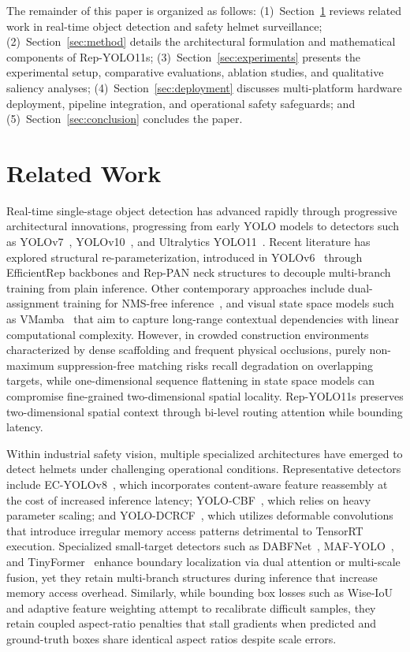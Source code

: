 \documentclass[conference]{IEEEtran}
\begin{document}
The remainder of this paper is organized as follows: (1)~Section~\ref{sec:related} reviews related work in real-time object detection and safety helmet surveillance; (2)~Section~\ref{sec:method} details the architectural formulation and mathematical components of Rep-YOLO11s; (3)~Section~\ref{sec:experiments} presents the experimental setup, comparative evaluations, ablation studies, and qualitative saliency analyses; (4)~Section~\ref{sec:deployment} discusses multi-platform hardware deployment, pipeline integration, and operational safety safeguards; and (5)~Section~\ref{sec:conclusion} concludes the paper.

\section{Related Work}
\label{sec:related}
Real-time single-stage object detection has advanced rapidly through progressive architectural innovations, progressing from early YOLO models to detectors such as YOLOv7~\cite{wang2023yolov7}, YOLOv10~\cite{wang2024yolov10}, and Ultralytics YOLO11~\cite{ultralytics2024yolo11}. Recent literature has explored structural re-parameterization, introduced in YOLOv6~\cite{li2023yolov6} through EfficientRep backbones and Rep-PAN neck structures to decouple multi-branch training from plain inference. Other contemporary approaches include dual-assignment training for NMS-free inference~\cite{wang2024yolov10,yolo26_2025}, and visual state space models such as VMamba~\cite{liu2024vmamba} that aim to capture long-range contextual dependencies with linear computational complexity. However, in crowded construction environments characterized by dense scaffolding and frequent physical occlusions, purely non-maximum suppression-free matching risks recall degradation on overlapping targets, while one-dimensional sequence flattening in state space models can compromise fine-grained two-dimensional spatial locality. Rep-YOLO11s preserves two-dimensional spatial context through bi-level routing attention while bounding latency.

Within industrial safety vision, multiple specialized architectures have emerged to detect helmets under challenging operational conditions. Representative detectors include EC-YOLOv8~\cite{ecyolov8_2024}, which incorporates content-aware feature reassembly at the cost of increased inference latency; YOLO-CBF~\cite{yolocbf_2025}, which relies on heavy parameter scaling; and YOLO-DCRCF~\cite{zhao2025yolodcrcf}, which utilizes deformable convolutions that introduce irregular memory access patterns detrimental to TensorRT execution. Specialized small-target detectors such as DABFNet~\cite{dabfnet2024}, MAF-YOLO~\cite{mafyolo2024}, and TinyFormer~\cite{tinyformer2024} enhance boundary localization via dual attention or multi-scale fusion, yet they retain multi-branch structures during inference that increase memory access overhead. Similarly, while bounding box losses such as Wise-IoU~\cite{tong2023wise} and adaptive feature weighting attempt to recalibrate difficult samples, they retain coupled aspect-ratio penalties that stall gradients when predicted and ground-truth boxes share identical aspect ratios despite scale errors.
\end{document}

